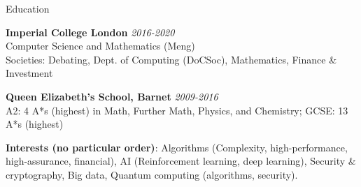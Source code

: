 \documentclass[10pt]{resume} %
\begin{document}

\begin{rSection}{Education}

{\bf Imperial College London} \hfill {\em 2016-2020} \\ 
Computer Science and Mathematics (Meng)\smallskip\\
Societies: Debating, Dept. of Computing (DoCSoc), Mathematics, Finance \& Investment

{\bf Queen Elizabeth's School, Barnet} \hfill {\em 2009-2016} \\ 
A2: 4 A*s (highest) in Math, Further Math, Physics, and Chemistry; GCSE: 13 A*s (highest)


\textbf{Interests (no particular order)}:
  Algorithms (Complexity, high-performance, high-assurance, financial),
  AI (Reinforcement learning, deep learning),
  Security \& cryptography,
  Big data,
  Quantum computing (algorithms, security).

\end{rSection}

\end{document}
